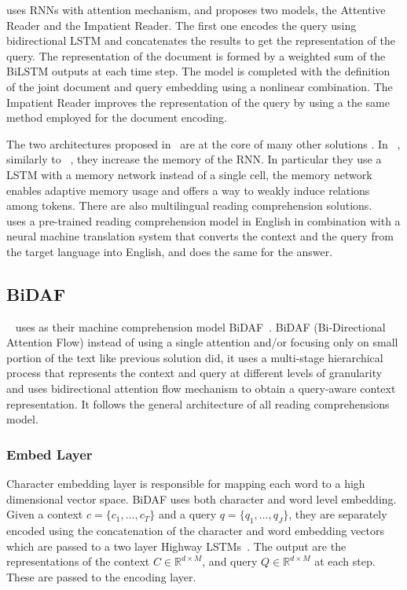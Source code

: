 \cite{hermann2015teaching} uses RNNs with attention mechanism, and proposes two models, the Attentive Reader and the Impatient Reader. The first one encodes the query using bidirectional LSTM and concatenates the results to get the representation of the query. The representation of the document is formed by a weighted sum of the BiLSTM outputs at each time step. The model is completed with the definition of the joint document and query embedding using a nonlinear combination. The Impatient Reader improves the representation of the query by using a the same method employed for the document encoding. 

The two architectures proposed in~\citep{hermann2015teaching} are at the core of many other solutions \citep{kadlec-etal-2016-text, chen-etal-2016-thorough}. In ~\citep{cheng-etal-2016-long}, similarly to ~\citep{weston2015memory}, they increase the memory of the RNN. In particular they use a LSTM with a memory network instead of a single cell, the memory network enables adaptive memory usage and offers a way to weakly induce relations among tokens.
There are also multilingual reading comprehension solutions. ~\cite{asai2018multi} uses a pre-trained reading comprehension model in English in combination with a neural machine translation system that converts the context and the query from the target language into English, and does the same for the answer. 


\subsection{BiDAF}
\label{sec:bidaf}
~\cite{levy2017zero} uses as their machine comprehension model BiDAF~\citep{seo2016bidirectional}. BiDAF (Bi-Directional Attention Flow) instead of using a single attention and/or focusing only on small portion of the text like previous solution did, it uses a multi-stage hierarchical process that represents the context and query at different levels of granularity and uses bidirectional attention flow mechanism to obtain a query-aware context representation. It follows the general architecture of all reading comprehensions model.

\subsubsection{Embed Layer}
Character embedding layer is responsible for mapping each word to a high dimensional vector space. BiDAF uses both character and word level embedding. Given a context $c =\{c_1, \dots, c_T\}$ and a query $q = \{q_1, \dots, q_J\}$, they are separately encoded using the concatenation of the character and word embedding vectors which are passed to a two layer Highway LSTMs~\citep{SrivastavaGS15highway}. The output are the representations of the context $C \in \mathbb{R}^{d\times M}$, and query $Q \in \mathbb{R}^{d\times M}$ at each step. These are passed to the encoding layer.

